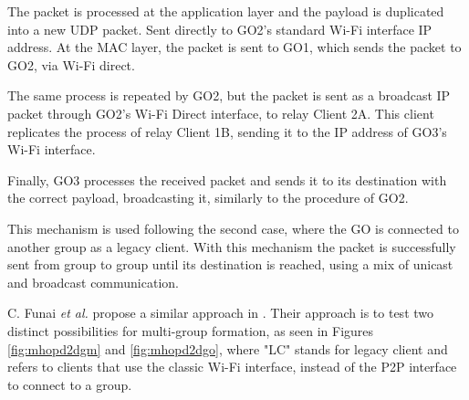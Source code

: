 The packet is processed at the application layer and the payload is duplicated into a new \gls{UDP} packet. Sent directly to GO2's standard Wi-Fi interface \gls{IP} address. At the \gls{MAC} layer, the packet is sent to GO1, which sends the packet to GO2, via Wi-Fi direct.

The same process is repeated by GO2, but the packet is sent as a broadcast \gls{IP} packet through GO2's Wi-Fi Direct interface, to relay Client 2A. This client replicates the process of relay Client 1B, sending it to the \gls{IP} address of GO3's Wi-Fi interface.

Finally, GO3 processes the received packet and sends it to its destination with the correct payload, broadcasting it, similarly to the procedure of GO2.

This mechanism is used following the second case, where the \gls{GO} is connected to another group as a legacy client. With this mechanism the packet is successfully sent from group to group until its destination is reached, using a mix of unicast and broadcast communication.\newline

C. Funai \textit{et al.} propose a similar approach in \cite{multiHopD2D}. Their approach is to test two distinct possibilities for multi-group formation, as seen in Figures \ref{fig:mhopd2dgm} and \ref{fig:mhopd2dgo}, where "LC" stands for legacy client and refers to clients that use the classic Wi-Fi interface, instead of the P2P interface to connect to a group.

